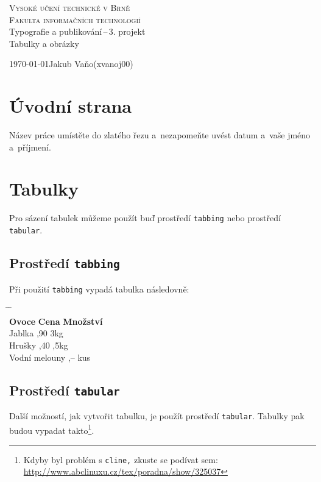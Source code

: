 \documentclass[11pt,a4paper]{article}
\begin{document}
\begin{titlepage}
\begin{center}
    \Huge\textsc{Vysoké učení technické v Brně}\\
    \huge\textsc{Fakulta informačních technologií}\\
    \LARGE{Typografie a publikování\,--\,3. projekt\\}
    \Huge{Tabulky a obrázky\\}
\end{center}
{\Large \today \hfill Jakub Vaňo(xvanoj00)}
\end{titlepage}

\section{Úvodní strana}
Název práce umístěte do zlatého řezu a~nezapomeňte uvést  datum a~vaše jméno a~příjmení.

\section{Tabulky}
Pro sázení tabulek můžeme použít buď prostředí \texttt{tabbing} nebo prostředí \texttt{tabular}.

\subsection{Prostředí \texttt{tabbing}}
Při použití \texttt{tabbing} vypadá  tabulka následovně:
\begin{tabbing}
    \hspace{2.75cm} \= \hspace{1.25cm} \= \hspace{1.25cm}\\
    \textbf{Ovoce} \> \textbf{Cena} \> \textbf{Množství}\\
    Jablka ,90 \> 3kg\\
    Hrušky ,40 ,5kg\\
    Vodní melouny ,--  kus\\
\end{tabbing}

\subsection{Prostředí \texttt{tabular}}
Další možností, jak vytvořit tabulku, je použít prostředí \texttt{tabular}. Tabulky pak budou vypadat takto\footnote{Kdyby byl problém s \texttt{cline,} zkuste se podívat sem: \href{http://www.abclinuxu.cz/tex/poradna/show/325037}{http://www.abclinuxu.cz/tex/poradna/show/325037}}.\\
\end{document}
